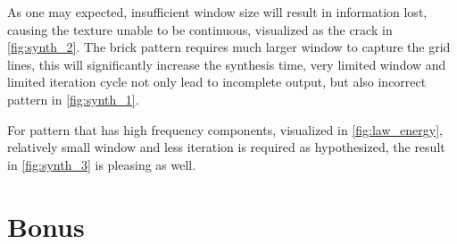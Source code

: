 \documentclass[12pt]{article}
\begin{document}
As one may expected, insufficient window size will result in information lost, causing the texture unable to be continuous, visualized as the crack in \autoref{fig:synth_2}.
The brick pattern requires much larger window to capture the grid lines, this will significantly increase the synthesis time, very limited window and limited iteration cycle not only lead to incomplete output, but also incorrect pattern in \autoref{fig:synth_1}. 

For pattern that has high frequency components, visualized in \autoref{fig:law_energy}, relatively small window and less iteration is required as hypothesized, the result in \autoref{fig:synth_3} is pleasing as well.

\section*{Bonus}
\end{document}
